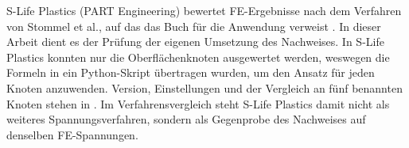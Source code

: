 
S-Life Plastics (PART Engineering) bewertet FE-Ergebnisse nach dem Verfahren von Stommel et al., auf das das Buch für die Anwendung verweist \cite[S.~375]{Sto18}. In dieser Arbeit dient es der Prüfung der eigenen Umsetzung des Nachweises. In S-Life Plastics konnten nur die Oberflächenknoten ausgewertet werden, weswegen die Formeln in ein Python-Skript übertragen wurden, um den Ansatz für jeden Knoten anzuwenden. Version, Einstellungen und der Vergleich an fünf benannten Knoten stehen in . Im Verfahrensvergleich steht S-Life Plastics damit nicht als weiteres Spannungsverfahren, sondern als Gegenprobe des Nachweises auf denselben FE-Spannungen.

